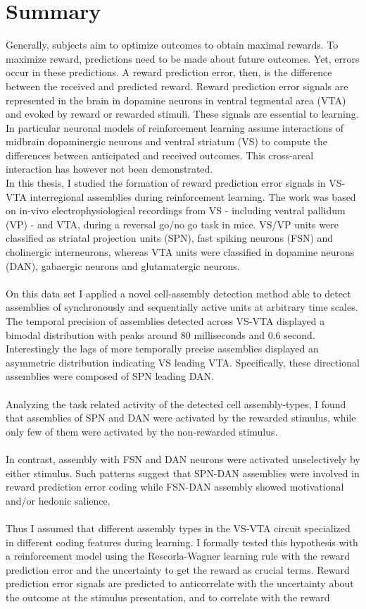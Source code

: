 \section*{Summary}
Generally, subjects aim to optimize outcomes to obtain maximal rewards. To maximize reward, predictions need to be made about future outcomes. Yet, errors occur in these predictions. A reward prediction error, then, is the difference between the received and predicted reward. Reward prediction error signals are represented in the brain in dopamine neurons in ventral tegmental area  (VTA) and evoked by reward or rewarded stimuli. These signals are essential to learning. In particular neuronal models of reinforcement learning assume interactions of midbrain dopaminergic neurons and ventral striatum (VS) to compute the differences between anticipated and received outcomes. This cross-areal interaction has however not been demonstrated.\\In this thesis, I studied the formation of reward prediction error signals in VS-VTA interregional assemblies during reinforcement learning. The work was based on in-vivo electrophysiological recordings from VS - including ventral pallidum (VP) - and VTA, during a reversal go/no go task in mice. VS/VP units were classified as striatal projection units (SPN), fast spiking neurons (FSN) and cholinergic interneurons, whereas VTA units were classified in dopamine neurons (DAN), gabaergic neurons and glutamatergic neurons.\\\\On this data set I applied a novel cell-assembly detection method able to detect assemblies of synchronously and sequentially active units at arbitrary time scales. The temporal precision of assemblies detected across VS-VTA displayed a bimodal distribution with peaks around $80$ milliseconds and $0.6$ second. Interestingly the lags of more temporally precise assemblies displayed an asymmetric distribution indicating VS leading VTA. Specifically, these directional assemblies were composed of SPN leading DAN.\\\\Analyzing the task related activity of the detected cell assembly-types, I found that assemblies of SPN and DAN were activated by the rewarded stimulus, while only few of them were activated by the non-rewarded stimulus.\\\\In contrast, assembly with FSN and DAN neurons were activated unselectively by either stimulus. Such patterns suggest that SPN-DAN assemblies were involved in reward prediction error coding while FSN-DAN assembly showed motivational and/or hedonic salience.\\\\Thus I assumed that different assembly types in the VS-VTA circuit specialized in different coding features during learning. I formally tested this hypothesis with a reinforcement model using the Rescorla-Wagner learning rule with the reward prediction error and the uncertainty to get the reward as crucial terms. Reward prediction error signals are predicted to anticorrelate with the uncertainty about the outcome at the stimulus presentation, and to correlate with the reward 